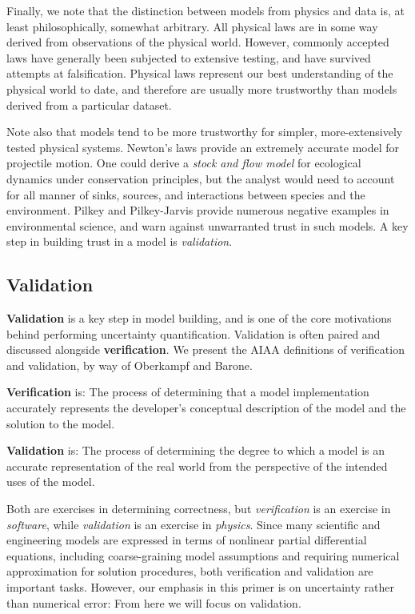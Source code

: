 \documentclass[../primer.tex]{subfiles}
\begin{document}
Finally, we note that the distinction between models from physics and data is,
at least philosophically, somewhat arbitrary. All physical laws are in some way
derived from observations of the physical world. However, commonly accepted laws
have generally been subjected to extensive testing, and have survived attempts
at falsification.\cite{popper2005logic} Physical laws represent our best
understanding of the physical world to date, and therefore are usually more
trustworthy than models derived from a particular dataset.

Note also that models tend to be more trustworthy for simpler, more-extensively
tested physical systems. Newton's laws provide an extremely accurate model for
projectile motion. One could derive a \emph{stock and flow model} for ecological
dynamics under conservation principles, but the analyst would need to account
for all manner of sinks, sources, and interactions between species and the
environment. Pilkey and Pilkey-Jarvis\cite{pilkey2007useless} provide numerous
negative examples in environmental science, and warn against unwarranted trust
in such models. A key step in building trust in a model is \emph{validation}.

\subsection{Validation}
\textbf{Validation} is a key step in model building, and is one of the core
motivations behind performing uncertainty quantification. Validation is often
paired and discussed alongside \textbf{verification}. We present the AIAA
definitions of verification and validation, by way of Oberkampf and
Barone.\cite{oberkampf2006measures}

\textbf{Verification} is: The process of determining that a model implementation
accurately represents the developer's conceptual description of the model and
the solution to the model.

\textbf{Validation} is: The process of determining the degree to which a model
is an accurate representation of the real world from the perspective of the
intended uses of the model.

Both are exercises in determining correctness, but \emph{verification} is an
exercise in \emph{software}, while \emph{validation} is an exercise in
\emph{physics}. Since many scientific and engineering models are expressed in
terms of nonlinear partial differential equations, including coarse-graining
model assumptions and requiring numerical approximation for solution procedures,
both verification and validation are important tasks. However, our emphasis in
this primer is on uncertainty rather than numerical error: From here we will
focus on validation.
\end{document}

